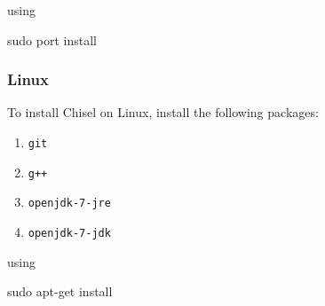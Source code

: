 \documentclass[twocolumn, 10pt]{article}
\begin{document}
\noindent
using

\begin{bash}
sudo port install
\end{bash}

\subsubsection{Linux}

To install Chisel on Linux, install the following packages:

\begin{enumerate}
\item \verb+git+
\item \verb|g++|
\item \verb+openjdk-7-jre+
\item \verb+openjdk-7-jdk+
\end{enumerate}

\noindent
using

\begin{bash}
sudo apt-get install
\end{bash}

% 
% 
\end{document}
